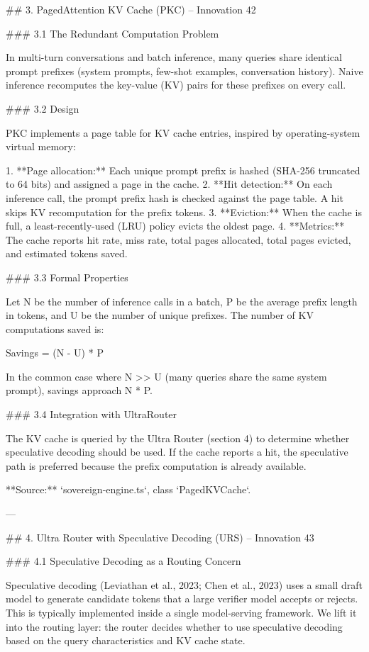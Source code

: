 ## 3. PagedAttention KV Cache (PKC) -- Innovation 42

### 3.1 The Redundant Computation Problem

In multi-turn conversations and batch inference, many queries share identical prompt prefixes (system prompts, few-shot examples, conversation history). Naive inference recomputes the key-value (KV) pairs for these prefixes on every call.

### 3.2 Design

PKC implements a page table for KV cache entries, inspired by operating-system virtual memory:

1. **Page allocation:** Each unique prompt prefix is hashed (SHA-256 truncated to 64 bits) and assigned a page in the cache.
2. **Hit detection:** On each inference call, the prompt prefix hash is checked against the page table. A hit skips KV recomputation for the prefix tokens.
3. **Eviction:** When the cache is full, a least-recently-used (LRU) policy evicts the oldest page.
4. **Metrics:** The cache reports hit rate, miss rate, total pages allocated, total pages evicted, and estimated tokens saved.

### 3.3 Formal Properties

Let N be the number of inference calls in a batch, P be the average prefix length in tokens, and U be the number of unique prefixes. The number of KV computations saved is:

Savings = (N - U) * P

In the common case where N >> U (many queries share the same system prompt), savings approach N * P.

### 3.4 Integration with UltraRouter

The KV cache is queried by the Ultra Router (section 4) to determine whether speculative decoding should be used. If the cache reports a hit, the speculative path is preferred because the prefix computation is already available.

**Source:** `sovereign-engine.ts`, class `PagedKVCache`.

---

## 4. Ultra Router with Speculative Decoding (URS) -- Innovation 43

### 4.1 Speculative Decoding as a Routing Concern

Speculative decoding (Leviathan et al., 2023; Chen et al., 2023) uses a small draft model to generate candidate tokens that a large verifier model accepts or rejects. This is typically implemented inside a single model-serving framework. We lift it into the routing layer: the router decides whether to use speculative decoding based on the query characteristics and KV cache state.

